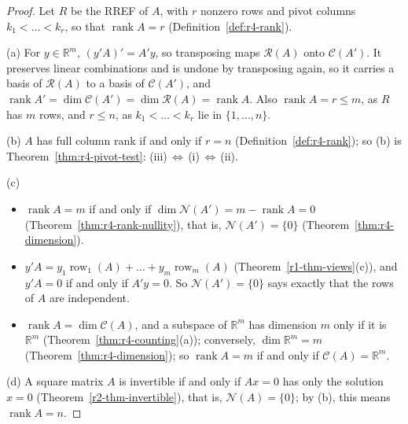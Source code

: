 \documentclass[12pt]{article}
\newcommand{\R}{\mathbb R}
\DeclareMathOperator{\row}{row}
\DeclareMathOperator{\rank}{rank}
\theoremstyle{definition}
\begin{document}
\begin{proof}
Let \(R\) be the RREF of \(A\), with \(r\) nonzero rows and pivot columns \(k_1<\dots<k_r\), so that
\(\rank A=r\) (Definition~\ref{def:r4-rank}).

(a) For \(y\in\R^m\), \((y'A)'=A'y\), so transposing maps \(\mathcal R(A)\) onto
\(\mathcal C(A')\). It preserves linear combinations and is undone by transposing again, so it
carries a basis of \(\mathcal R(A)\) to a basis of \(\mathcal C(A')\), and
\(\rank A'=\dim\mathcal C(A')=\dim\mathcal R(A)=\rank A\). Also \(\rank A=r\leqslant m\), as
\(R\) has \(m\) rows, and \(r\leqslant n\), as \(k_1<\dots<k_r\) lie in \(\{1,\dots,n\}\).

(b) \(A\) has full column rank if and only if \(r=n\) (Definition~\ref{def:r4-rank}); so (b) is
Theorem~\ref{thm:r4-pivot-test}: (iii)\,\(\Leftrightarrow\)\,(i)\,\(\Leftrightarrow\)\,(ii).

(c)
\begin{itemize}
\item \(\rank A=m\) if and only if \(\dim\mathcal N(A')=m-\rank A=0\)
(Theorem~\ref{thm:r4-rank-nullity}), that is, \(\mathcal N(A')=\{0\}\) (Theorem~\ref{thm:r4-dimension}).
\item \(y'A=y_1\row_1(A)+\dots+y_m\row_m(A)\) (Theorem~\ref{r1-thm-views}(c)), and \(y'A=0\) if and only if
\(A'y=0\). So \(\mathcal N(A')=\{0\}\) says exactly that the rows of \(A\) are independent.
\item \(\rank A=\dim\mathcal C(A)\), and a subspace of \(\R^m\) has dimension \(m\) only if it is
\(\R^m\) (Theorem~\ref{thm:r4-counting}(a)); conversely, \(\dim\R^m=m\) (Theorem~\ref{thm:r4-dimension}); so
\(\rank A=m\) if and only if \(\mathcal C(A)=\R^m\).
\end{itemize}
(d) A square matrix \(A\) is invertible if and only if \(Ax=0\) has only the solution \(x=0\)
(Theorem~\ref{r2-thm-invertible}), that is, \(\mathcal N(A)=\{0\}\); by (b), this means \(\rank A=n\).
\end{proof}
\end{document}
